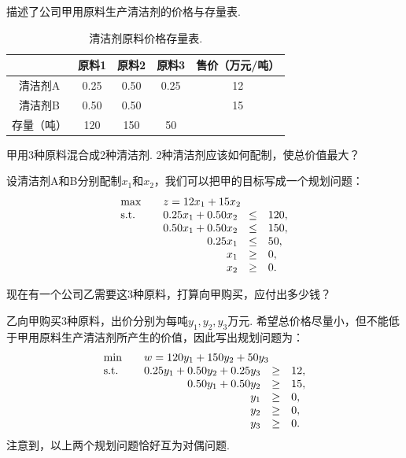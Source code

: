\begin{example}[线性规划的经济学解释]
 描述了公司甲用原料生产清洁剂的价格与存量表. 
\begin{table}
        \centering
        \begin{tabular}{c|ccc|c}
        \hline
                 & 原料1&原料2&原料3&售价（万元/吨） \\
                 \hline
             清洁剂A  & 0.25&0.50&0.25&12 \\
             清洁剂B & 0.50&0.50& &15\\
             \hline
             存量（吨）&120&150&50& \\
             \hline
        \end{tabular}
        \caption{清洁剂原料价格存量表. }
        \label{tab:cleaner}
\end{table}

甲用3种原料混合成2种清洁剂. 2种清洁剂应该如何配制，使总价值最大？

设清洁剂A和B分别配制$x_1$和$x_2$，我们可以把甲的目标写成一个规划问题：
\begin{align*}
\begin{array}{lrcl}
\max\quad&\multicolumn{3}{l}{z=12x_1+15x_2}\\
\text{s.t.}\quad&0.25x_1+0.50x_2&\le&120,\\
&0.50x_1+0.50x_2&\le&150,\\
&0.25x_1&\le& 50,\\
&x_1&\ge& 0,\\
&x_2&\ge& 0.
\end{array}
\end{align*}

现在有一个公司乙需要这3种原料，打算向甲购买，应付出多少钱？

乙向甲购买3种原料，出价分别为每吨$y_1,y_2,y_3$万元. 希望总价格尽量小，但不能低于甲用原料生产清洁剂所产生的价值，因此写出规划问题为：
\[
 \begin{array}{lrcl}
\min\quad&\multicolumn{3}{l}{w=120y_1+150y_2+50y_3} \\
\text{s.t.}\quad& 0.25y_1+0.50y_2+0.25y_3&\ge&12,\\
&0.50y_1+0.50y_2&\ge&15,\\
&y_1&\ge&0,\\
&y_2&\ge&0,\\
&y_3&\ge&0.
 \end{array}
\]
注意到，以上两个规划问题恰好互为对偶问题.
\end{example}

